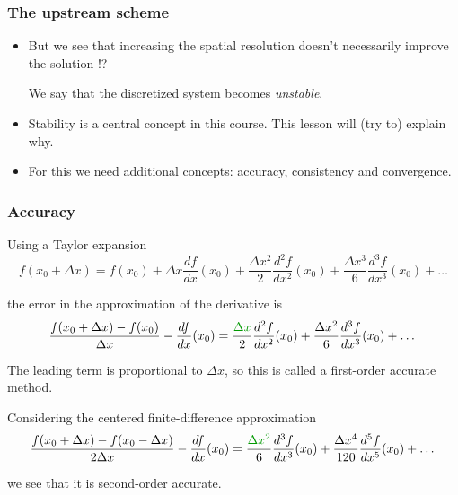 \documentclass[aspectratio=43,9pt]{beamer}
\begin{document}
%
%
\begin{frame}
	\frametitle{The upstream scheme}
	\begin{itemize}
		\item But we see that increasing the spatial resolution doesn't necessarily improve the solution !?\vspace*{2ex}
			\par
			We say that the discretized system becomes \emph{unstable}.\vspace*{3ex}
		\item Stability is a central concept in this course. This lesson will (try to) explain why.\vspace*{2ex}
		\item For this we need additional concepts: accuracy, consistency and convergence.
	\end{itemize}
\end{frame}
%
%
\begin{frame}
	\frametitle{Accuracy}
	Using a Taylor expansion\vspace*{2ex}
	\begin{equation*}
		f(x_0+\Delta x) = f(x_0) +
		\Delta x \frac{df}{dx} (x_0)
		+ \frac{\Delta x^2}{2} \frac{d^2f}{dx^2} (x_0)
		+ \frac{\Delta x^3}{6} \frac{d^3 f}{dx^3} (x_0) + \dots
	\end{equation*}\par\vspace*{2ex}
	the error in the approximation of the derivative is\vspace*{2ex}
	\begin{equation*}
		\frac{f(x_0+\Delta x) - f(x_0)}{\Delta x}
		- \frac{d f}{dx} (x_0) =
		\frac{\textcolor{green!60!black}{\Delta x}}{2} \frac{d^2 f}{dx^2} (x_0)
		+ \frac{\Delta x^2}{6} \frac{d^3 f}{dx^3} (x_0) + \dots
	\end{equation*}\par\vspace*{2ex}
	The leading term is proportional to $\Delta x$, so this is called a first-order accurate method.\vspace*{2ex}
\pause
	\par
	Considering the centered finite-difference approximation
	\begin{equation*}
		\frac{f(x_0+\Delta x) - f(x_0 - \Delta x)}{2 \Delta x}
		- \frac{d f}{dx} (x_0) =
		\frac{\textcolor{green!60!black}{\Delta x^2}}{6} \frac{d^3 f}{dx^3} (x_0) +
		\frac{\Delta x^4}{120} \frac{d^5 f}{dx^5} (x_0) + \dots
	\end{equation*}\par\vspace*{2ex}
	we see that it is second-order accurate.
\end{frame}
\end{document}
